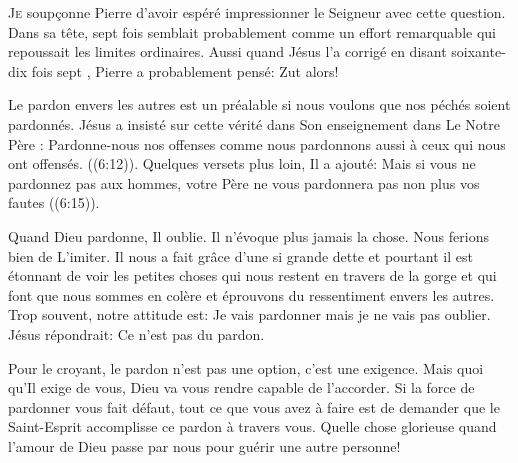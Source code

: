 



\lettrine{J}{e} soup\c{c}onne Pierre d'avoir espéré impressionner le Seigneur
 avec cette question. Dans sa tête, \Og sept fois \Fg{} semblait probablement
 comme un effort remarquable qui repoussait les limites ordinaires.
 Aussi quand Jésus l'a corrigé en disant \Og soixante-dix fois sept \Fg{},
 Pierre a probablement pensé: \Og Zut alors! \Fg{}

Le pardon envers les autres est un préalable si nous voulons
 que nos péchés soient pardonnés. Jésus a insisté sur cette vérité
 dans Son enseignement dans \Og Le Notre Père \Fg{}: 
 \Og Pardonne-nous nos offenses comme nous pardonnons aussi
 à ceux qui nous ont offensés. \Fg{} ((6:12)).
 Quelques versets plus loin, Il a ajouté: 
 \Og Mais si vous ne pardonnez pas aux hommes,
 votre Père ne vous pardonnera pas non plus vos fautes \Fg{} 
 ((6:15)). 


Quand Dieu pardonne, Il oublie. Il n'évoque plus jamais la chose.
 Nous ferions bien de L'imiter. Il nous a fait grâce d'une si grande dette
 et pourtant il est étonnant de voir les petites choses
 qui nous restent en travers de la gorge et qui font que nous sommes en colère
 et éprouvons du ressentiment envers les autres.
 Trop souvent, notre attitude est: 
 \Og Je vais pardonner \ocadr mais je ne vais pas oublier. \Fg{}
 Jésus répondrait: \Og Ce n'est pas du pardon. \Fg{}

Pour le croyant, le pardon n'est pas une option, c'est une exigence.
 Mais quoi qu'Il  exige de vous, Dieu va vous rendre
 capable de l'accorder. Si la force de pardonner vous fait défaut,
 tout ce que vous avez à faire est de demander que le Saint-Esprit
 accomplisse ce pardon à travers vous.
 Quelle chose glorieuse quand l'amour de Dieu passe par nous pour guérir
 une autre personne!

